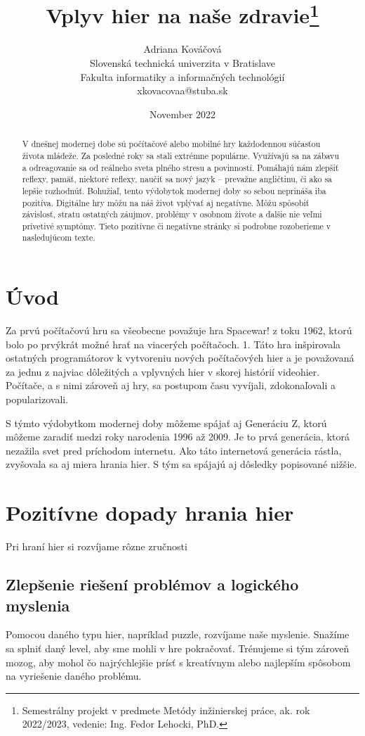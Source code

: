 \documentclass[10pt,twoside,slovak,a4paper]{article}
\title{Vplyv hier na naše zdravie\thanks{Semestrálny projekt v predmete Metódy inžinierskej práce, ak. rok 2022/2023, vedenie: Ing. Fedor Lehocki, PhD.}}
\author{Adriana Kováčová\\
	{\small Slovenská technická univerzita v Bratislave}\\
	{\small Fakulta informatiky a informačných technológií}\\
	{\small {xkovacovaa@stuba.sk}}
	}
\date{November 2022}
\begin{document}
\maketitle


\begin{abstract}
V dnešnej modernej dobe sú počítačové alebo mobilné hry každodennou súčasťou života mládeže. Za posledné roky sa stali extrémne populárne. Využívajú sa na zábavu a odreagovanie sa od reálneho sveta plného stresu a povinností. Pomáhajú nám zlepšiť reflexy, pamäť, niektoré reflexy, naučiť sa nový jazyk – prevažne angličtinu, či ako sa lepšie rozhodnúť. Bohužiaľ, tento výdobytok modernej doby so sebou neprináša iba pozitíva.
Digitálne hry môžu na náš život vplývať aj negatívne. Môžu spôsobiť závislosť, stratu ostatných záujmov, problémy v osobnom živote a ďalšie nie veľmi prívetivé symptómy. Tieto pozitívne či negatívne stránky si podrobne rozoberieme v nasledujúcom texte.
\end{abstract}

\section{Úvod}

Za prvú počítačovú hru sa všeobecne považuje hra Spacewar! z toku 1962, ktorú bolo po prvýkrát možné hrať na viacerých počítačoch. 1. Táto hra inšpirovala ostatných programátorov k vytvoreniu nových počítačových hier a je považovaná za jednu z najviac dôležitých a vplyvných hier v skorej histórií videohier. Počítače, a s nimi zároveň aj hry, sa postupom času vyvíjali, zdokonaľovali a popularizovali. 

S týmto výdobytkom modernej doby môžeme spájať aj Generáciu Z, ktorú môžeme zaradiť medzi roky narodenia 1996 až 2009. Je to prvá generácia, ktorá nezažila svet pred príchodom internetu. Ako táto internetová generácia rástla, zvyšovala sa aj miera hrania hier. S tým sa spájajú aj dôsledky popisované nižšie.


\section{Pozitívne dopady hrania hier}
Pri hraní hier si rozvíjame rôzne zručnosti
\cite {neviem}

\subsection{Zlepšenie riešení problémov a logického myslenia}
Pomocou daného typu hier, napríklad puzzle, rozvíjame naše myslenie. Snažíme sa splniť daný level, aby sme mohli v hre pokračovať. Trénujeme si tým zároveň mozog, aby mohol čo najrýchlejšie prísť s kreatívnym alebo najlepším spôsobom na vyriešenie daného problému.
\end{document}
